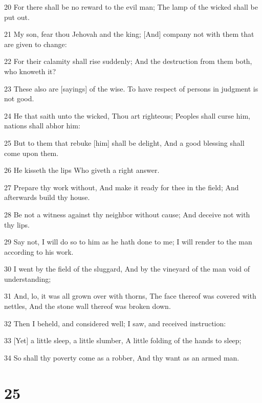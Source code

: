 \par 20 For there shall be no reward to the evil man; The lamp of the wicked shall be put out.
\par 21 My son, fear thou Jehovah and the king; [And] company not with them that are given to change:
\par 22 For their calamity shall rise suddenly; And the destruction from them both, who knoweth it?
\par 23 These also are [sayings] of the wise. To have respect of persons in judgment is not good.
\par 24 He that saith unto the wicked, Thou art righteous; Peoples shall curse him, nations shall abhor him:
\par 25 But to them that rebuke [him] shall be delight, And a good blessing shall come upon them.
\par 26 He kisseth the lips Who giveth a right answer.
\par 27 Prepare thy work without, And make it ready for thee in the field; And afterwards build thy house.
\par 28 Be not a witness against thy neighbor without cause; And deceive not with thy lips.
\par 29 Say not, I will do so to him as he hath done to me; I will render to the man according to his work.
\par 30 I went by the field of the sluggard, And by the vineyard of the man void of understanding;
\par 31 And, lo, it was all grown over with thorns, The face thereof was covered with nettles, And the stone wall thereof was broken down.
\par 32 Then I beheld, and considered well; I saw, and received instruction:
\par 33 [Yet] a little sleep, a little slumber, A little folding of the hands to sleep;
\par 34 So shall thy poverty come as a robber, And thy want as an armed man.

\chapter{25}

